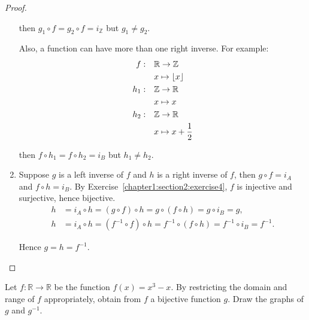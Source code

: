 \begin{proof}
\begin{enumerate}[label={(\alph*)}]
              then $g_{1}\circ f = g_{2}\circ f = i_{\mathbb{Z}}$ but $g_{1}\ne g_{2}$.

              Also, a function can have more than one right inverse. For example:
              \begin{align*}
                  f:     & \quad \mathbb{R} \to \mathbb{Z} \\
                         & \quad x \mapsto \left\lfloor{x}\right\rfloor       \\
                  h_{1}: & \quad\mathbb{Z} \to \mathbb{R}  \\
                         & \quad x\mapsto x                \\
                  h_{2}: & \quad\mathbb{Z} \to \mathbb{R}  \\
                         & \quad x \mapsto x + \frac{1}{2}
              \end{align*}

              then $f\circ h_{1} = f\circ h_{2} = i_{B}$ but $h_{1}\ne h_{2}$.
        \item Suppose $g$ is a left inverse of $f$ and $h$ is a right inverse of $f$, then $g\circ f = i_{A}$ and $f\circ h = i_{B}$. By Exercise~\ref{chapter1:section2:exercise4}, $f$ is injective and surjective, hence bijective.
              \begin{align*}
                  h & = i_{A}\circ h = (g\circ f)\circ h = g\circ (f\circ h) = g\circ i_{B} = g,                     \\
                  h & = i_{A}\circ h = (f^{-1}\circ f)\circ h = f^{-1}\circ (f\circ h) = f^{-1}\circ i_{B} = f^{-1}.
              \end{align*}

              Hence $g = h = f^{-1}$.
    \end{enumerate}
\end{proof}

\begin{exercise}\label{chapter1:section2:exercise6}
    Let $f: \mathbb{R}\to\mathbb{R}$ be the function $f(x) = x^{3} - x$. By restricting the domain and range of $f$ appropriately, obtain from $f$ a bijective function $g$. Draw the graphs of $g$ and $g^{-1}$.
\end{exercise}

